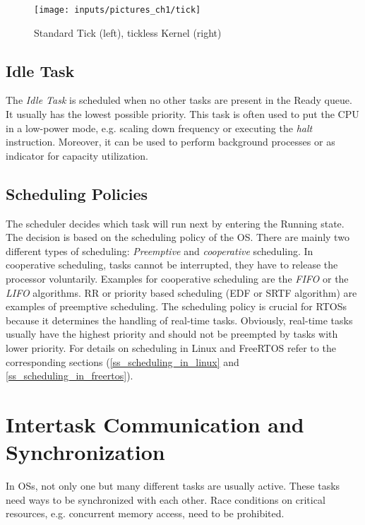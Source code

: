 \begin{figure}[htb]
	\begin{center}
		\texttt{[image: inputs/pictures\_ch1/tick]}
		\caption[Standard Tick and tickless Kernel]{Standard Tick (left), tickless Kernel (right) \cite{barry:ftssp}} \label{fig_tick}
	\end{center}
\end{figure}

\subsection{Idle Task}
The \textit{Idle Task} is scheduled when no other tasks are present in the Ready queue.
It usually has the lowest possible priority.
This task is often used to put the \ac{CPU} in a low-power mode, e.g. scaling down frequency or executing the \textit{halt} instruction. 
Moreover, it can be used to perform background processes or as indicator for capacity utilization.  
  
\subsection{Scheduling Policies}\label{ss_scheduling_policy} 
The scheduler decides which task will run next by entering the Running state. 
The decision is based on the scheduling policy of the \ac{OS}.
There are mainly two different types of scheduling: \textit{Preemptive} and \textit{cooperative} scheduling.
In cooperative scheduling, tasks cannot be interrupted, they have to release the processor voluntarily. 
Examples for cooperative scheduling are the \textit{\ac{FIFO}} or the \textit{\ac{LIFO}} algorithms.
\ac{RR} or priority based scheduling (\ac{EDF} or \ac{SRTF} algorithm) are examples of preemptive scheduling.
The scheduling policy is crucial for \acp{RTOS} because it determines the handling of real-time tasks.
Obviously, real-time tasks usually have the highest priority and should not be preempted by tasks with lower priority.
For details on scheduling in Linux and FreeRTOS refer to the corresponding sections (\ref{ss_scheduling_in_linux} and \ref{ss_scheduling_in_freertos}).

\section{Intertask Communication and Synchronization}\label{s_intertask_communication}
In \acp{OS}, not only one but many different tasks are usually active.
These tasks need ways to be synchronized with each other.
Race conditions on critical resources, e.g. concurrent memory access, need to be prohibited.

